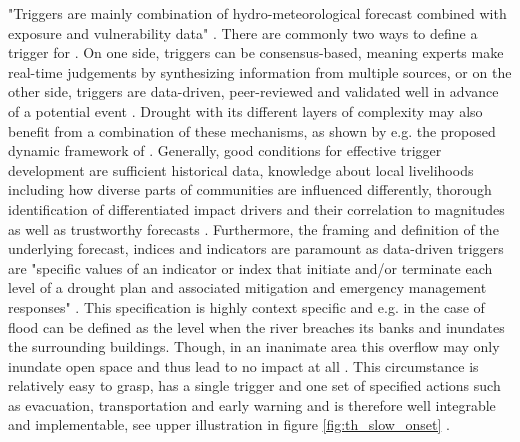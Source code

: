 "Triggers are mainly combination of hydro-meteorological forecast combined with exposure and vulnerability data" \autocite[19]{rcrcFORECASTBASEDFINANCINGEARLY2020}. There are commonly two ways to define a trigger for . On one side, triggers can be consensus-based, meaning experts make real-time judgements by synthesizing information from multiple sources, or on the other side, triggers are data-driven, peer-reviewed and validated well in advance of a potential event \autocite{rcrcFORECASTBASEDFINANCINGEARLY2020}. Drought with its different layers of complexity may also benefit from a combination of these mechanisms, as shown by e.g. the proposed dynamic framework of \autocite{boultDroughtImpactbasedForecasting2022}. Generally, good conditions for effective trigger development are sufficient historical data, knowledge about local livelihoods including how diverse parts of communities are influenced differently, thorough identification of differentiated impact drivers and their correlation to magnitudes as well as trustworthy forecasts \autocite{coughlandeperezForecastbasedFinancingApproach2015,coughlandeperezActionbasedFloodForecasting2016,stephensFORECASTBASEDACTION2015,harrowsmithFutureForecastImpact2020,rcrcFORECASTBASEDFINANCINGEARLY2020}.\newline
Furthermore, the framing and definition of the underlying forecast, indices and indicators are paramount as data-driven triggers are "specific values of an indicator or index that initiate and/or terminate each level of a drought plan and associated mitigation and emergency management responses" \autocites[13]{svobodaHandbookDroughtIndicators2016}. This specification is highly context specific and e.g. in the case of flood can be defined as the level when the river breaches its banks and inundates the surrounding buildings. Though, in an inanimate area this overflow may only inundate open space and thus lead to no impact at all \autocite{stephensFORECASTBASEDACTION2015}. This circumstance is relatively easy to grasp, has a single trigger and one set of specified actions such as evacuation, transportation and early warning and is therefore well integrable and implementable, see upper illustration in figure \ref{fig:th_slow_onset} \autocite{siahaanForecastbasedActionDREF2018}. 


